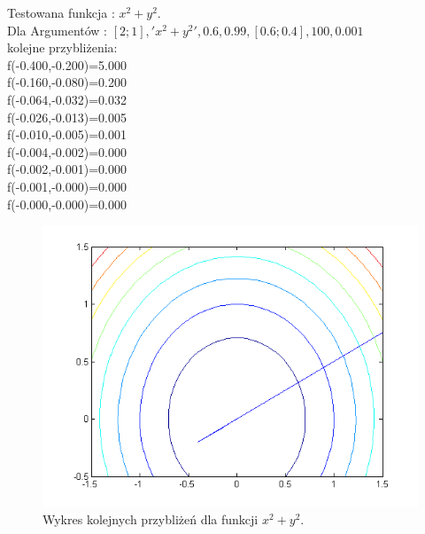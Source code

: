 \documentclass{classrep}
\begin{document}
Testowana funkcja : $x^2+y^2$.\\
Dla Argumentów : $[2;1],'x^2+y^2',0.6,0.99,[0.6;0.4],100,0.001$\\
kolejne przybliżenia:\\
f(-0.400,-0.200)=5.000\\
f(-0.160,-0.080)=0.200\\
f(-0.064,-0.032)=0.032\\
f(-0.026,-0.013)=0.005\\
f(-0.010,-0.005)=0.001\\
f(-0.004,-0.002)=0.000\\
f(-0.002,-0.001)=0.000\\
f(-0.001,-0.000)=0.000\\
f(-0.000,-0.000)=0.000\\


\begin{figure}[H]
\centering
\includegraphics[width=12cm]{fcja1} 
\caption{Wykres kolejnych przybliżeń dla funkcji $x^2+y^2$.}
\label{fig:funkcja_1}
\end{figure}
\end{document}
